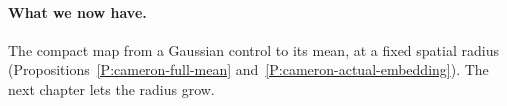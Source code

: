 \paragraph{What we now have.}
The compact map from a Gaussian control to its mean, at a fixed spatial radius
(Propositions~\ref{P:cameron-full-mean} and~\ref{P:cameron-actual-embedding}).
The next chapter lets the radius grow.
